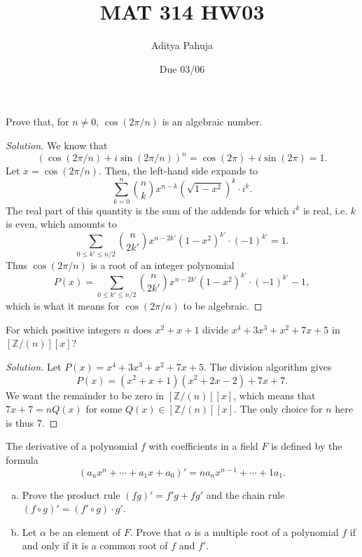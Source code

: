 \documentclass[10pt]{scrartcl}
\title{\vspace{-2em}MAT 314 HW03}
\author{\large Aditya Pahuja}
\date{\large Due 03/06}
\providecommand{\ZZ}{\mathbb Z}
\providecommand{\ii}{\item}
\newenvironment{soln}{\begin{proof}[Solution]}{\end{proof}}
\begin{document}
\maketitle

\begin{problem*}[1.2]
	Prove that, for $n\ne 0$, $\cos(2\pi/n)$ is an algebraic number.
\end{problem*}

\begin{soln}
	We know that
	\[(\cos(2\pi/n) + i\sin(2\pi/n))^n = \cos(2\pi) + i\sin(2\pi) = 1.\]
	Let $x = \cos(2\pi/n)$. Then, the left-hand side expands to
	\[\sum_{k=0}^n \binom nk x^{n-k} (\sqrt{1-x^2})^{k}\cdot i^k.\]
	The real part of this quantity is the sum of the addends
	for which $i^k$ is real, i.e. $k$ is even, which amounts to
	\[\sum_{0\le k'\le n/2} \binom n{2k'}
	x^{n-2k'}(1-x^2)^{k'}\cdot (-1)^{k'} = 1.\]
	Thus $\cos(2\pi/n)$ is a root of an integer polynomial
	\[P(x) = \sum_{0\le k'\le n/2} \binom n{2k'}
	x^{n-2k'}(1-x^2)^{k'}\cdot (-1)^{k'} - 1,\]
	which is what it means for $\cos(2\pi/n)$ to be algebraic.
\end{soln}

\begin{problem*}[2.1]
	For which positive integers $n$ does
	$x^2 + x + 1$ divide $x^4 + 3x^3 + x^2 + 7x + 5$ in $[\ZZ/(n)][x]$?
\end{problem*}

\begin{soln}
	Let $P(x) = x^4 + 3x^3 + x^2 + 7x + 5$. The division algorithm gives
	\[P(x) = (x^2 + x + 1)(x^2 + 2x - 2) + 7x + 7.\]
	We want the remainder to be zero in $[\ZZ/(n)][x]$,
	which means that $7x + 7 = nQ(x)$ for some $Q(x)\in[\ZZ/(n)][x]$.
	The only choice for $n$ here is thus $\boxed 7$.
\end{soln}

\begin{problem*}[3.5]
	The derivative of a polynomial $f$ with coefficients in a field $F$
	is defined by the formula
	\[(a_nx^n + \cdots + a_1x + a_0)' = na_nx^{n-1} + \cdots + 1a_1.\]
	\begin{enumerate}[(a)]
		\ii Prove the product rule $(fg)' = f'g + fg'$ and the chain rule
		$(f\circ g)' = (f'\circ g)\cdot g'$.
		\ii Let $\alpha$ be an element of $F$. Prove that $\alpha$
		is a multiple root of a polynomial $f$ if and only if
		it is a common root of $f$ and $f'$.
	\end{enumerate}
\end{problem*}
\end{document}
